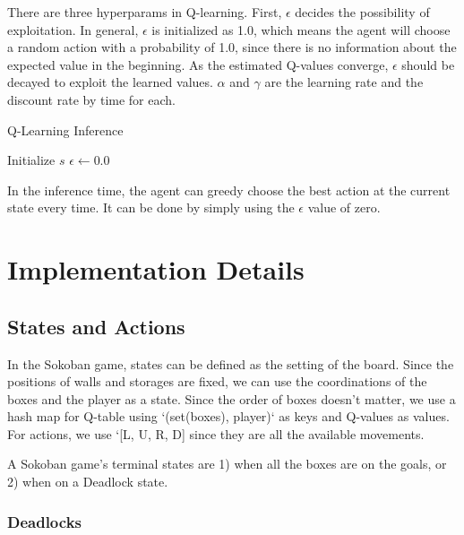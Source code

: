 \documentclass{article}
\begin{document}
There are three hyperparams in Q-learning. First, $\epsilon$ decides the possibility of exploitation. In general, $\epsilon$ is initialized as 1.0, which means the agent will choose a random action with a probability of 1.0, since there is no information about the expected value in the beginning. As the estimated Q-values converge, $\epsilon$ should be decayed to exploit the learned values. $\alpha$ and $\gamma$ are the learning rate and the discount rate by time for each.

\begin{algorithm}[H]
\caption{Q-Learning Inference}\label{alg:two}
Initialize $s$ 
$\epsilon \gets 0.0$ 

\end{algorithm}

In the inference time, the agent can greedy choose the best action at the current state every time. It can be done by simply using the $\epsilon$ value of zero.



\section{Implementation Details}

\subsection{States and Actions}

In the Sokoban game, states can be defined as the setting of the board. Since the positions of walls and storages are fixed, we can use the coordinations of the boxes and the player as a state. Since the order of boxes doesn't matter, we use a hash map for Q-table using `(set(boxes), player)` as keys and Q-values as values. For actions, we use `[L, U, R, D] since they are all the available movements.

A Sokoban game's terminal states are 1) when all the boxes are on the goals, or 2) when on a Deadlock state.

\subsubsection{Deadlocks}
\end{document}
